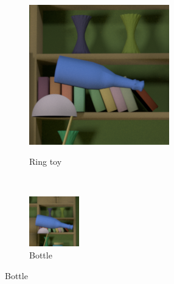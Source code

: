 \documentclass{jov}
\begin{document}
\begin{figure}
\begin{subfigure}[b]{0.14 \textwidth}
        \label{fig:libraryWithXylophone}
    \end{subfigure}
    ~
	\begin{subfigure}[b]{0.14 \textwidth}
        \caption{Ring toy}
        \includegraphics[width=\textwidth]{../FiguresDraft4/Figure4/Figure4_e.png}
        \label{fig:libraryWithRingToy}
    \end{subfigure}
        ~
    	\begin{subfigure}[b]{0.14 \textwidth}
        \caption{Bottle}
        \includegraphics[width=\textwidth]{../FiguresDraft4/Figure4/Figure4_f.png}

\end{subfigure}
\end{figure}
\end{document}
